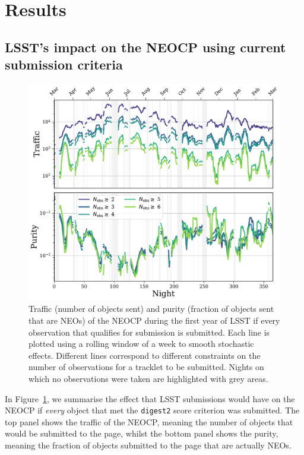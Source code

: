 \documentclass[twocolumn]{aastex631}
\newcommand{\dig}{\texttt{digest2}}
\begin{document}
\section{Results} \label{sec:results}
\subsection{LSST's impact on the NEOCP using current submission criteria}\label{sec:traffic_basic}
\begin{figure}
    \centering
    \includegraphics[width=\textwidth]{traffic_purity.pdf}
    \caption{Traffic (number of objects sent) and purity (fraction of objects sent that are NEOs) of the NEOCP during the first year of LSST if every observation that qualifies for submission is submitted. Each line is plotted using a rolling window of a week to smooth stochastic effects. Different lines correspond to different constraints on the number of observations for a tracklet to be submitted. Nights on which no observations were taken are highlighted with grey areas.}
    \label{fig:neocp_traffic}
\end{figure}

In Figure~\ref{fig:neocp_traffic}, we summarise the effect that LSST submissions would have on the NEOCP if \textit{every} object that met the \dig{} score criterion was submitted. The top panel shows the traffic of the NEOCP, meaning the number of objects that would be submitted to the page, whilst the bottom panel shows the purity, meaning the fraction of objects submitted to the page that are actually NEOs.
\end{document}
